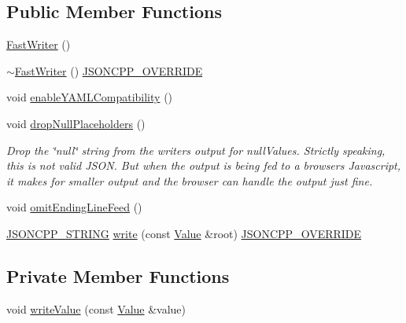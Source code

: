\subsection*{Public Member Functions}
\begin{DoxyCompactItemize}
\item 
\hyperlink{class_json_1_1_fast_writer_a1bbc73ce1a1cc7b09cd1e02db3905170}{Fast\+Writer} ()
\item 
\hyperlink{class_json_1_1_fast_writer_a34152eac509fe00c9b2e15ce2fc94ab8}{$\sim$\+Fast\+Writer} () \hyperlink{json_8h_a824d6199c91488107e443226fa6022c5}{J\+S\+O\+N\+C\+P\+P\+\_\+\+O\+V\+E\+R\+R\+I\+DE}
\item 
void \hyperlink{class_json_1_1_fast_writer_a78d98e9f76d33660ad6e6a1abe287d45}{enable\+Y\+A\+M\+L\+Compatibility} ()
\item 
void \hyperlink{class_json_1_1_fast_writer_a6e93d8dce951e408517311026a065b40}{drop\+Null\+Placeholders} ()
\begin{DoxyCompactList}\small\item\em Drop the \char`\"{}null\char`\"{} string from the writer\textquotesingle{}s output for null\+Values. Strictly speaking, this is not valid J\+S\+ON. But when the output is being fed to a browser\textquotesingle{}s Javascript, it makes for smaller output and the browser can handle the output just fine. \end{DoxyCompactList}\item 
void \hyperlink{class_json_1_1_fast_writer_af4ee077d365d75941fb2688d97207a55}{omit\+Ending\+Line\+Feed} ()
\item 
\hyperlink{json_8h_a1e723f95759de062585bc4a8fd3fa4be}{J\+S\+O\+N\+C\+P\+P\+\_\+\+S\+T\+R\+I\+NG} \hyperlink{class_json_1_1_fast_writer_a93d45ba4bc312371d08beb3e3dfbe654}{write} (const \hyperlink{class_json_1_1_value}{Value} \&root) \hyperlink{json_8h_a824d6199c91488107e443226fa6022c5}{J\+S\+O\+N\+C\+P\+P\+\_\+\+O\+V\+E\+R\+R\+I\+DE}
\end{DoxyCompactItemize}
\subsection*{Private Member Functions}
\begin{DoxyCompactItemize}
\item 
void \hyperlink{class_json_1_1_fast_writer_a2ef4a2ce13a341171f01f414f4fdd765}{write\+Value} (const \hyperlink{class_json_1_1_value}{Value} \&value)
\end{DoxyCompactItemize}
